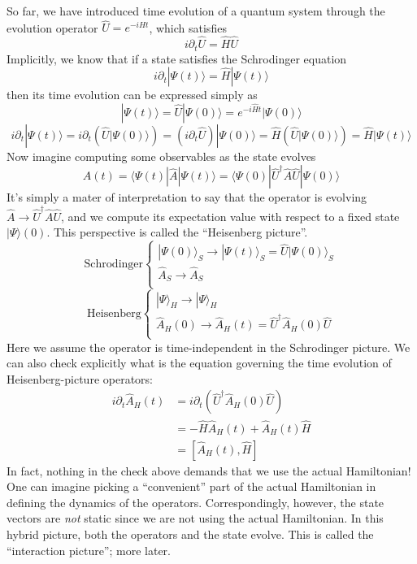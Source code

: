 So far, we have introduced time evolution of a quantum system through the evolution operator $\hat{U}=e^{-i\hat{H}t}$, which satisfies
\[ i\partial _t\hat{U}=\hat{H}\hat{U}\]
Implicitly, we know that if a state satisfies the Schrodinger equation
\[ i\partial _t|\Psi \left( t \right) \rangle =\hat{H}|\Psi \left( t \right) \rangle \]
then its time evolution can be expressed simply as
\[ |\Psi \left( t \right) \rangle =\hat{U}|\Psi \left( 0 \right) \rangle =e^{-i\hat{H}t}|\Psi \left( 0 \right) \rangle \]
\[ i\partial _t|\Psi \left( t \right) \rangle =i\partial _t\left( \hat{U}|\Psi \left( 0 \right) \rangle \right) =\left( i\partial _t\hat{U} \right) |\Psi \left( 0 \right) \rangle =\hat{H}\left( \hat{U}|\Psi \left( 0 \right) \rangle \right) =\hat{H}|\Psi \left( t \right) \rangle \]
Now imagine computing some observables as the state evolves
\[ A\left( t \right) =\langle \Psi \left( t \right) |\hat{A}|\Psi \left( t \right) \rangle =\langle \Psi \left( 0 \right) |\hat{U}^{\dagger}\hat{A}\hat{U}|\Psi \left( 0 \right) \rangle \]
It's simply a mater of interpretation to say that the operator is evolving $\hat{A}\rightarrow \hat{U}^{\dagger}\hat{A}\hat{U}$, and we compute its expectation value with respect to a fixed state $|\Psi\rangle(0)$. This perspective is called the ``Heisenberg picture''.
\[ \mathrm{Schrodinger}\begin{cases}
	|\Psi \left( 0 \right) \rangle _S\rightarrow |\Psi \left( t \right) \rangle _S=\hat{U}|\Psi \left( 0 \right) \rangle _S\\
	\hat{A}_S\rightarrow \hat{A}_S\\
\end{cases}\]
\[ \mathrm{Heisenberg}\begin{cases}
	|\Psi \rangle _H\rightarrow |\Psi \rangle _H\\
	\hat{A}_H\left( 0 \right) \rightarrow \hat{A}_H\left( t \right) =\hat{U}^{\dagger}\hat{A}_H\left( 0 \right) \hat{U}\\
\end{cases}\]
Here we assume the operator is time-independent in the Schrodinger picture. We can also check explicitly what is the equation governing the time evolution of Heisenberg-picture operators:
\begin{align*}
    i\partial _t\hat{A}_H\left( t \right) &=i\partial _t\left( \hat{U}^{\dagger}\hat{A}_H\left( 0 \right) \hat{U} \right) \\
    &=-\hat{H}\hat{A}_H\left( t \right) +\hat{A}_H\left( t \right) \hat{H}\\
    &=\left[ \hat{A}_H\left( t \right) ,\hat{H} \right]
\end{align*}
In fact, nothing in the check above demands that we use the actual Hamiltonian! One can imagine picking a ``convenient'' part of the actual Hamiltonian in defining the dynamics of the operators. Correspondingly, however, the state vectors are \emph{not} static since we are not using the actual Hamiltonian. In this hybrid picture, both the operators and the state evolve. This is called the ``interaction picture''; more later.

